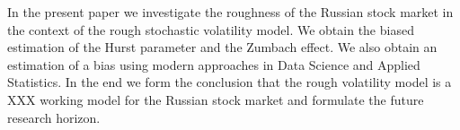 In the present paper we investigate the roughness of the Russian stock market in the context of the 
rough stochastic volatility model. We obtain the biased estimation of the Hurst parameter and the 
Zumbach effect. We also obtain an estimation of a bias using modern approaches in Data Science and 
Applied Statistics. In the end we form the conclusion that the rough volatility model is a XXX working
model for the Russian stock market and formulate the future research horizon.
